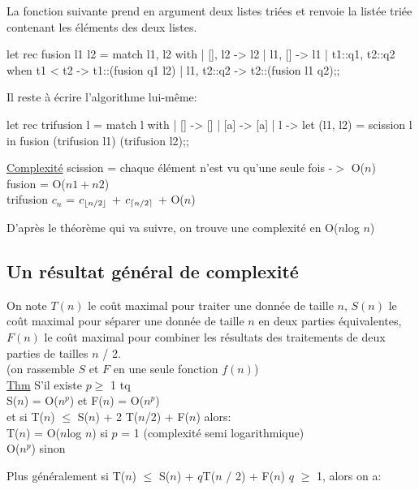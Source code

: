 \documentclass{article}
\DeclarePairedDelimiter\ceil{\lceil}{\rceil}
\DeclarePairedDelimiter\floor{\lfloor}{\rfloor}
\begin{document}
				La fonction suivante prend en argument deux listes triées et renvoie la listée triée contenant les éléments des deux listes.
				
				\begin{case}
let rec fusion l1 l2 = match l1, l2 with
| [], l2 -> l2
| l1, [] -> l1
| t1::q1, t2::q2 when t1 < t2 -> t1::(fusion q1 l2)
| l1, t2::q2 -> t2::(fusion l1 q2);; 
				\end{case}
				
				Il reste à écrire l'algorithme lui-même:
				
				\begin{case}
let rec trifusion l = match l with
| [] -> []
| [a] -> [a]
| l -> let (l1, l2) = scission l in fusion (trifusion l1) (trifusion l2);; 
				\end{case}
				
				\underline{Complexité} scission = chaque élément n'est vu qu'une seule fois -$>$ O($n$)\\
				fusion = O($n1 + n2$)\\
				trifusion $c_n$ = $c_{\floor{n / 2}}$ + $c_{\ceil{n / 2}}$ + O($n$)
				
				D'après le théorème qui va suivre, on trouve une complexité en O($n$log $n$)
				
			\subsection{Un résultat général de complexité}
				
				On note $T(n)$ le coût maximal pour traiter une donnée de taille $n$, $S(n)$ le coût maximal pour séparer une donnée de taille $n$ en deux parties équivalentes, $F(n)$ le coût maximal pour combiner les résultats des traitements de deux parties de tailles $n$ / 2.\\
				(on rassemble $S$ et $F$ en une seule fonction $f(n)$)\\
				
				\underline{Thm} S'il existe $p \geqslant$ 1 tq\\
				S($n$) = O($n^p$) et F($n$) = O($n^p$)\\
				et si T($n$) $\leqslant$ S($n$) + 2 T($n$/2) + F($n$) alors:\\
				T($n$) = O($n$log $n$) si $p$ = 1 (complexité semi logarithmique)\\
							 O($n^p$) sinon
							
				Plus généralement si T($n$) $\leqslant$ S($n$) + $q$T($n$ / 2) + F($n$) $q$ $\geqslant$ 1, alors on a:\\
				
\end{document}
